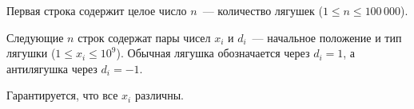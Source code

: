 Первая строка содержит целое число $n$~--- количество лягушек ($1 \leq n \leq 100\,000$).

Следующие $n$ строк содержат пары чисел $x_i$ и $d_i$~--- начальное положение и тип лягушки ($1 \leq x_i \leq 10^9$). Обычная лягушка обозначается через $d_i = 1$, а антилягушка 
через $d_i = -1$.

Гарантируется, что все $x_i$ различны.